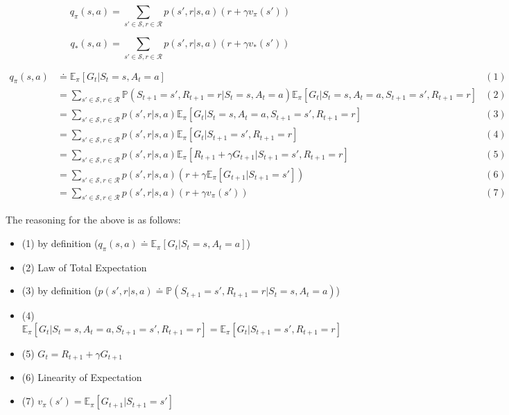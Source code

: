 \documentclass[12pt]{amsart}
\begin{document}
\begin{equation*}
q_\pi(s,a) = \sum_{s' \in \mathcal{S}, r\in\mathcal{R}}p(s',r|s,a)(r + \gamma v_\pi(s'))
\end{equation*}

\begin{equation*}
q_*(s,a) = \sum_{s' \in \mathcal{S}, r\in\mathcal{R}}p(s',r|s,a)(r + \gamma v_*(s'))
\end{equation*}

\begin{align*}
q_\pi(s,a) &\doteq \mathbb{E}_{\pi}[ G_t | S_t = s, A_t = a ] & (1)\\
&= \sum_{s' \in \mathcal{S}, r\in\mathcal{R}}\mathbb{P}(S_{t+1}=s', R_{t+1}=r|S_t=s, A_t=a)\mathbb{E}_{\pi}[ G_{t} | S_t = s, A_t = a, S_{t+1}=s', R_{t+1}=r] & (2)\\
&= \sum_{s' \in \mathcal{S}, r\in\mathcal{R}}p(s',r|s,a)\mathbb{E}_{\pi}[ G_{t} | S_t = s, A_t = a, S_{t+1}=s', R_{t+1}=r] & (3)\\
&= \sum_{s' \in \mathcal{S}, r\in\mathcal{R}}p(s',r|s,a)\mathbb{E}_{\pi}[ G_{t} | S_{t+1}=s', R_{t+1}=r] & (4)\\
&= \sum_{s' \in \mathcal{S}, r\in\mathcal{R}}p(s',r|s,a)\mathbb{E}_{\pi}[ R_{t+1} + \gamma G_{t+1} | S_{t+1}=s', R_{t+1}=r] & (5)\\
&= \sum_{s' \in \mathcal{S}, r\in\mathcal{R}}p(s',r|s,a)(r  + \gamma \mathbb{E}_\pi[G_{t+1} | S_{t+1}=s'] ) & (6)\\
&= \sum_{s' \in \mathcal{S}, r\in\mathcal{R}}p(s',r|s,a)(r  + \gamma v_\pi(s') ) & (7)
\end{align*}

\vspace{.5in}

The reasoning for the above is as follows:
\vspace{.2in}
\begin{itemize}
\item (1) by definition ($q_\pi(s,a) \doteq \mathbb{E}_{\pi}[ G_t | S_t = s, A_t = a ]$) \\
\item (2) Law of Total Expectation\\
\item (3) by definition ($p(s',r|s,a)\doteq\mathbb{P}(S_{t+1}=s', R_{t+1}=r|S_t=s, A_t=a)$)\\
\item (4) $\mathbb{E}_{\pi}[ G_{t} | S_t = s, A_t = a, S_{t+1}=s', R_{t+1}=r] = \mathbb{E}_{\pi}[ G_{t} | S_{t+1}=s', R_{t+1}=r]$\\
\item (5) $G_t = R_{t+1} + \gamma G_{t+1}$\\
\item (6) Linearity of Expectation\\
\item (7) $v_\pi(s') = \mathbb{E}_\pi[G_{t+1} | S_{t+1}=s']$
\end{itemize}
\end{document}
